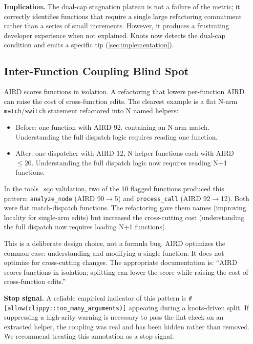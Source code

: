 \documentclass[10pt,twocolumn,letterpaper]{article}
\begin{document}
\textbf{Implication.}  The dual-cap stagnation plateau is not a failure
of the metric; it correctly identifies functions that require a single
large refactoring commitment rather than a series of small increments.
However, it produces a frustrating developer experience when not explained.
Knots now detects the dual-cap condition and emits a specific tip
(\cref{sec:implementation}).

\subsection{Inter-Function Coupling Blind Spot}
\label{sec:inter-fn}

AIRD scores functions in isolation.  A refactoring that lowers
per-function AIRD can raise the cost of cross-function edits.  The
clearest example is a flat N-arm \texttt{match}/\texttt{switch} statement
refactored into N named helpers:

\begin{itemize}
    \item Before: one function with AIRD 92, containing an N-arm match.
        Understanding the full dispatch logic requires reading one function.
    \item After: one dispatcher with AIRD 12, N helper functions each
        with AIRD $\leq 20$.  Understanding the full dispatch logic now
        requires reading N+1 functions.
\end{itemize}

In the tools\_sqc validation, two of the 10 flagged functions produced
this pattern: \texttt{analyze\_node} (AIRD 90$\rightarrow$5) and
\texttt{process\_call} (AIRD 92$\rightarrow$12).  Both were flat
match-dispatch functions.  The refactoring gave them names (improving
locality for single-arm edits) but increased the cross-cutting cost
(understanding the full dispatch now requires loading N+1 functions).

This is a deliberate design choice, not a formula bug.  AIRD optimizes
the common case: understanding and modifying a single function.  It does
not optimize for cross-cutting changes.  The appropriate documentation
is: ``AIRD scores functions in isolation; splitting can lower the score
while raising the cost of cross-function edits.''

\textbf{Stop signal.}  A reliable empirical indicator of this pattern is
\texttt{\#[allow(clippy::too\_many\_arguments)]} appearing during a
knots-driven split.  If suppressing a high-arity warning is necessary to
pass the lint check on an extracted helper, the coupling was real and
has been hidden rather than removed.  We recommend treating this
annotation as a stop signal.
\end{document}
